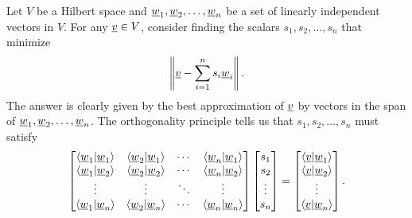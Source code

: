 Let $V$ be a Hilbert space and $\underline{w}_1 ,\underline{w}_2 , \ldots, \underline{w}_n$ be a set of linearly independent vectors in $V$.
For any $\underline{v} \in V$, consider finding the scalars $s_1,s_2,\ldots,s_n$ that minimize
\[ \left\| \underline{v} - \sum_{i=1}^n s_i \underline{w}_i \right\|. \]
The answer is clearly given by the best approximation of $\underline{v}$ by vectors in the span of $\underline{w}_1 ,\underline{w}_2 , \ldots, \underline{w}_n$.
The orthogonality principle tells us that $s_1,s_2,\ldots,s_n$ must satisfy
\begin{equation} \label{eqn:DualNormalEquations}
\begin{bmatrix}
\left\langle \underline{w}_1 | \underline{w}_1 \right\rangle
& \left\langle \underline{w}_2 | \underline{w}_1 \right\rangle & \cdots
& \left\langle \underline{w}_n | \underline{w}_1 \right\rangle \\
\left\langle \underline{w}_1 | \underline{w}_2 \right\rangle
& \left\langle \underline{w}_2 | \underline{w}_2 \right\rangle & \cdots
& \left\langle \underline{w}_n | \underline{w}_2 \right\rangle \\
\vdots & \vdots & \ddots & \vdots \\
\left\langle \underline{w}_1 | \underline{w}_n \right\rangle
& \left\langle \underline{w}_2 | \underline{w}_n \right\rangle & \cdots
& \left\langle \underline{w}_n | \underline{w}_n \right\rangle
\end{bmatrix}
\begin{bmatrix} s_1 \\ s_2 \\ \vdots \\ s_n \end{bmatrix}
= \begin{bmatrix}
\left\langle \underline{v} | \underline{w}_1 \right\rangle \\
\left\langle \underline{v} | \underline{w}_2 \right\rangle \\ \vdots \\
\left\langle \underline{v} | \underline{w}_n \right\rangle \end{bmatrix} .
\end{equation}


